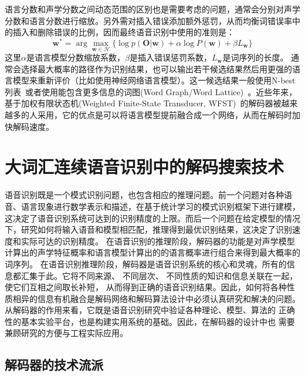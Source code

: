 语言分数和声学分数之间动态范围的区别也是需要考虑的问题，通常会分别对声学分数和语言分数进行缩放。另外需对插入错误添加额外惩罚，从而均衡词错误率中的插入和删除错误的比例，因而最终语音识别中使用的准则是：
\begin{equation}
\mathbf{w}^* = \arg \max_{\mathbf{w} \in \mathcal{H}} \{\log p(\mathbf{O}|\mathbf{w}) + \alpha \log P(\mathbf{w}) + \beta L_{\mathbf{w}}\}
\end{equation}
这里$\alpha$是语言模型分数缩放系数，$\beta$是插入错误惩罚系数，$L_{\mathbf{w}}$是词序列的长度。
通常会选择最大概率的路径作为识别结果，也可以输出若干候选结果然后用更强的语言模型来重新评价（比如使用神经网络语言模型）。这一候选结果一般使用N-best列表~\cite{schwartz1990n}或者使用能包含更多信息的词图(Word Graph/Word Lattice)~\cite{ortmanns1997word}。近些年来，基于加权有限状态机(Weighted Finite-State Transducer, WFST)~\cite{mohri2002weighted}的解码器被越来越多的人采用，它的优点是可以将语言模型提前融合成一个网络，从而在解码时加快解码速度。




\section{大词汇连续语音识别中的解码搜索技术}
\label{chap:intro-lvcsr}

语音识别既是一个模式识别问题，也包含相应的推理问题。前一个问题对各种语音、语言现象进行数学表示和描述，在基于统计学习的模式识别框架下进行建模，这决定了语音识别系统可达到的识别精度的上限。而后一个问题在给定模型的情况下，研究如何将输入语音和模型相匹配，推理得到最优识别结果，这决定了识别速度和实际可达的识别精度。
%
在语音识别的推理阶段，解码器的功能是对声学模型计算出的声学特征概率和语言模型计算出的的语言概率进行组合来得到最大概率的词序列。
%
在语音识别推理阶段，解码器是语音识别系统的核心和灵魂，所有的信息都汇集于此。它将不同来源、 不同层次、 不同性质的知识和信息关联在一起，使它们互相之间取长补短， 从而得到正确的语音识别结果。因此，如何将各种性质相异的信息有机融合是解码网络和解码算法设计中必须认真研究和解决的问题。
从解码器的作用来看，它既是语音识别研究中验证各种理论、模型、算法的
正确性的基本实验平台，也是构建实用系统的基础。因此，在解码器的设计中也
需要兼顾研究的方便与工程实际应用。

\subsection{解码器的技术流派}
\label{chap:intro-lvcsr-decmethod}

